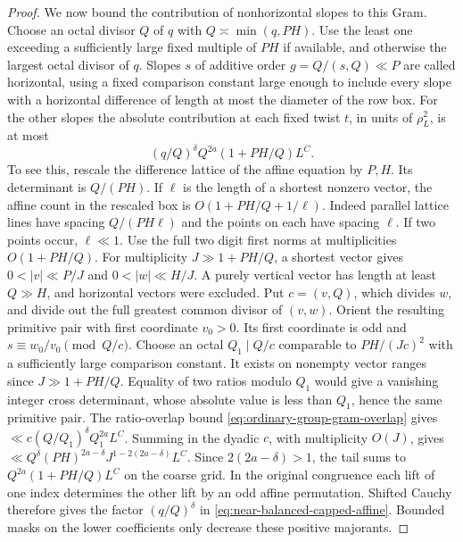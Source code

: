 \documentclass[11pt,a4paper]{article}
\theoremstyle{paperplain}
\numberwithin{equation}{section}
\begin{document}
\begin{proof}
We now bound the contribution of nonhorizontal slopes to this Gram.
Choose an octal divisor $Q$ of $q$ with $Q\asymp\min(q,PH)$.
Use the least one exceeding a sufficiently large fixed multiple
of $PH$ if available, and otherwise the largest octal divisor
of $q$.
Slopes $s$ of additive order $g=Q/(s,Q)\ll P$ are called
horizontal, using a fixed comparison constant large enough
to include every slope with a horizontal difference of length
at most the diameter of the row box. For the other slopes the
absolute contribution at each fixed twist $t$, in units of
$\rho_L^2$, is at most
\begin{equation}\label{eq:near-balanced-capped-affine}
              (q/Q)^\delta Q^{2a}(1+PH/Q)L^C.
\end{equation}
To see this, rescale the difference lattice of the affine
equation by $P,H$. Its determinant is $Q/(PH)$. If $\ell$ is
the length of a shortest nonzero vector, the affine count in
the rescaled box is $O(1+PH/Q+1/\ell)$. Indeed parallel
lattice lines have spacing $Q/(PH\ell)$ and the points on
each have spacing $\ell$. If two points occur, $\ell\ll1$.
Use the full two digit first norms at multiplicities
$O(1+PH/Q)$. For multiplicity $J\gg1+PH/Q$, a shortest
vector gives $0<|v|\ll P/J$ and $0<|w|\ll H/J$. A purely
vertical vector has length at least $Q\gg H$, and horizontal
vectors were excluded. Put $c=(v,Q)$, which divides $w$, and
divide out the full greatest common divisor of $(v,w)$. Orient
the resulting primitive pair with first coordinate $v_0>0$.
Its first coordinate is odd and $s\equiv w_0/v_0\pmod{Q/c}$.
Choose an octal $Q_1\mid Q/c$ comparable to $PH/(Jc)^2$ with a
sufficiently large comparison constant. It exists on nonempty
vector ranges since $J\gg 1+PH/Q$. Equality of two ratios modulo
$Q_1$ would give a vanishing integer cross determinant, whose
absolute value is less than $Q_1$, hence the same primitive pair.
The ratio-overlap bound \eqref{eq:ordinary-group-gram-overlap} gives
$\ll c (Q/Q_1)^\delta Q_1^{2a}L^C$. Summing in the dyadic $c$,
with multiplicity $O(J)$, gives
$\ll Q^\delta(PH)^{2a-\delta}J^{1-2(2a-\delta)}L^C$.
Since $2(2a-\delta)>1$, the tail sums to
$Q^{2a}(1+PH/Q)L^C$ on the coarse grid. In the original
congruence each lift of one index determines the other lift
by an odd affine permutation. Shifted Cauchy therefore gives
the factor $(q/Q)^\delta$ in \eqref{eq:near-balanced-capped-affine}.
Bounded masks on the
lower coefficients only decrease these positive majorants.


\end{proof}
\end{document}
